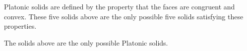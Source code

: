 %
%
%
%
%
%
%
%
%
%
%
%
%
%




Platonic solids are defined by the property that the faces are congruent and convex. These five solids above are the only possible five solids satisfying these properties. 


\begin{prop}
The solids above are the only possible Platonic solids.
\end{prop}

